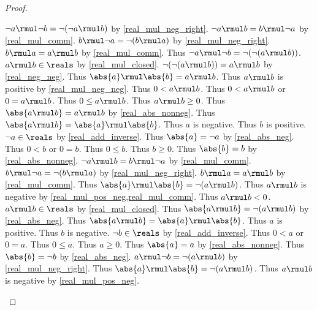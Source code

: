 \begin{proof}
\begin{byCase}
\begin{byCase}
\begin{byCase}
                $\neg{a} \rmul \neg{b} = \neg{(\neg{a} \rmul b)}$ by \cref{real_mul_neg_right}.
                $\neg{a} \rmul b = b \rmul \neg{a}$ by \cref{real_mul_comm}.
                $b \rmul \neg{a} = \neg{(b \rmul a)}$ by \cref{real_mul_neg_right}.
                $b \rmul a = a \rmul b$ by \cref{real_mul_comm}.
                Thus $\neg{a} \rmul \neg{b} = \neg{(\neg{(a \rmul b)})}$.
                $a \rmul b\in\reals$ by \cref{real_mul_closed}.
                $\neg{(\neg{(a \rmul b)})} = a \rmul b$ by \cref{real_neg_neg}.
                Thus $\abs{a} \rmul \abs{b} = a \rmul b$.
                Thus $a \rmul b$ is positive by \cref{real_mul_neg_neg}.
                Thus $0 < a \rmul b$.
                Thus $0 < a \rmul b$ or $0 = a \rmul b$.
                Thus $0 \leq a \rmul b$.
                Thus $a \rmul b \geq 0$.
                Thus $\abs{a \rmul b} = a \rmul b$ by \cref{real_abs_nonneg}.
                Thus $\abs{a \rmul b} = \abs{a} \rmul \abs{b}$.
                Thus $a$ is negative.
                Thus $b$ is positive.
                $\neg{a}\in\reals$ by \cref{real_add_inverse}.
                Thus $\abs{a} = \neg{a}$ by \cref{real_abs_neg}.
                Thus $0 < b$ or $0 = b$.
                Thus $0 \leq b$.
                Thus $b \geq 0$.
                Thus $\abs{b} = b$ by \cref{real_abs_nonneg}.
                $\neg{a} \rmul b = b \rmul \neg{a}$ by \cref{real_mul_comm}.
                $b \rmul \neg{a} = \neg{(b \rmul a)}$ by \cref{real_mul_neg_right}.
                $b \rmul a = a \rmul b$ by \cref{real_mul_comm}.
                Thus $\abs{a} \rmul \abs{b} = \neg{(a \rmul b)}$.
                Thus $a \rmul b$ is negative by \cref{real_mul_pos_neg,real_mul_comm}.
                Thus $a \rmul b < 0$.
                $a \rmul b\in\reals$ by \cref{real_mul_closed}.
                Thus $\abs{a \rmul b} = \neg{(a \rmul b)}$ by \cref{real_abs_neg}.
                Thus $\abs{a \rmul b} = \abs{a} \rmul \abs{b}$.
                Thus $a$ is positive.
                Thus $b$ is negative.
                $\neg{b}\in\reals$ by \cref{real_add_inverse}.
                Thus $0 < a$ or $0 = a$.
                Thus $0 \leq a$.
                Thus $a \geq 0$.
                Thus $\abs{a} = a$ by \cref{real_abs_nonneg}.
                Thus $\abs{b} = \neg{b}$ by \cref{real_abs_neg}.
                $a \rmul \neg{b} = \neg{(a \rmul b)}$ by \cref{real_mul_neg_right}.
                Thus $\abs{a} \rmul \abs{b} = \neg{(a \rmul b)}$.
                Thus $a \rmul b$ is negative by \cref{real_mul_pos_neg}.

\end{byCase}
\end{byCase}
\end{byCase}
\end{proof}
